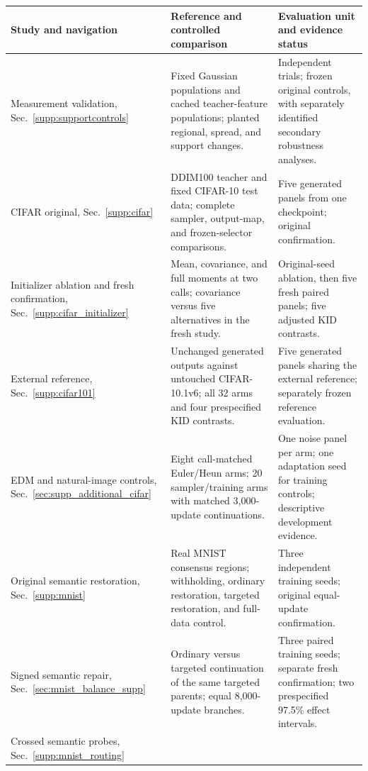 \begin{table}[t]
\centering\small
\setlength{\tabcolsep}{5pt}
\renewcommand{\arraystretch}{1.12}
\begin{tabular}{>{\raggedright\arraybackslash}p{}>{\raggedright\arraybackslash}p{}>{\raggedright\arraybackslash}p{}}
\toprule
Study and navigation & Reference and controlled comparison & Evaluation unit and evidence status \\
\midrule
Measurement validation, Sec.~\ref{supp:supportcontrols}
& Fixed Gaussian populations and cached teacher-feature populations; planted regional, spread, and support changes.
& Independent trials; frozen original controls, with separately identified secondary robustness analyses. \\
CIFAR original, Sec.~\ref{supp:cifar}
& DDIM100 teacher and fixed CIFAR-10 test data; complete sampler, output-map, and frozen-selector comparisons.
& Five generated panels from one checkpoint; original confirmation. \\
Initializer ablation and fresh confirmation, Sec.~\ref{supp:cifar_initializer}
& Mean, covariance, and full moments at two calls; covariance versus five alternatives in the fresh study.
& Original-seed ablation, then five fresh paired panels; five adjusted KID contrasts. \\
External reference, Sec.~\ref{supp:cifar101}
& Unchanged generated outputs against untouched CIFAR-10.1v6; all 32 arms and four prespecified KID contrasts.
& Five generated panels sharing the external reference; separately frozen reference evaluation. \\
EDM and natural-image controls, Sec.~\ref{sec:supp_additional_cifar}
& Eight call-matched Euler/Heun arms; 20 sampler/training arms with matched 3,000-update continuations.
& One noise panel per arm; one adaptation seed for training controls; descriptive development evidence. \\
Original semantic restoration, Sec.~\ref{supp:mnist}
& Real MNIST consensus regions; withholding, ordinary restoration, targeted restoration, and full-data control.
& Three independent training seeds; original equal-update confirmation. \\
Signed semantic repair, Sec.~\ref{sec:mnist_balance_supp}
& Ordinary versus targeted continuation of the same targeted parents; equal 8,000-update branches.
& Three paired training seeds; separate fresh confirmation; two prespecified 97.5\% effect intervals. \\
Crossed semantic probes, Sec.~\ref{supp:mnist_routing}

\end{tabular}
\end{table}
